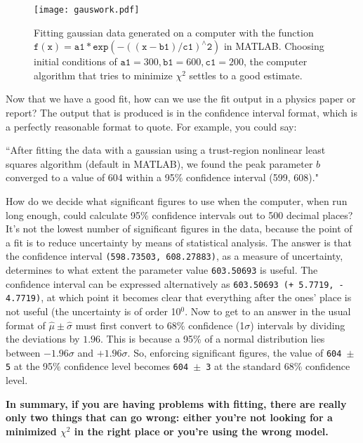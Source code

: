 \begin{center}
\Large {}

 \begin{figure}[H]
 
 \texttt{[image: gauswork.pdf]}
 \caption{Fitting gaussian data generated on a computer with the function $ \mathtt{f(x)} =  \mathtt{a1}*\mathtt{exp}(-((\mathtt{x-b1})/\mathtt{c1})^\wedge \mathtt{ 2})$ in MATLAB. Choosing initial conditions of $\texttt{a1} = 300, \texttt{b1} = 600, \texttt{c1} = 200$, the computer algorithm that tries to minimize $\chi^2$ settles to a good estimate.}
  \label{gauswork}
 \end{figure}
\end{center}
Now that we have a good fit, how can we use the fit output in a physics paper or report? The output that is produced is in the confidence interval format, which is a perfectly reasonable format to quote. For example, you could say:
\begin{framed}
``After fitting the data with a gaussian using a trust-region nonlinear least squares algorithm (default in MATLAB), we found the peak parameter $b$ converged to a value of 604 within a 95\% confidence interval (599, 608)."
\end{framed}
How do we decide what significant figures to use when the computer, when run long enough, could calculate 95\% confidence intervals out to 500 decimal places? It's not the lowest number of significant figures in the data, because the point of a fit is to reduce uncertainty by means of statistical analysis. The answer is that the confidence interval \texttt{(598.73503, 608.27883)}, as a measure of uncertainty, determines to what extent the parameter value \texttt{603.50693} is useful. The confidence interval can be expressed alternatively as \texttt{603.50693 (+ 5.7719, -  4.7719)}, at which point it becomes clear that everything after the ones' place is not useful (the uncertainty is of order 10$^0$. Now to get to an answer in the usual format of $\hat \mu \pm \hat \sigma$ must first convert to 68\% confidence (1$\sigma$) intervals by dividing the deviations by $1.96$. This is because a 95\% of a normal distribution lies between $-1.96\sigma$ and $+1.96\sigma$. So, enforcing significant figures, the value of \texttt{604 $\pm$ 5} at the 95\% confidence level becomes \texttt{604 $\pm$ 3}
at the standard 68\% confidence level.
\begin{framed}
{\bf In summary, if you are having problems with fitting, there are really only two things that can go wrong: either you're not looking for a minimized $\chi^2$ in the right place or you're using the wrong model.}
\end{framed}

